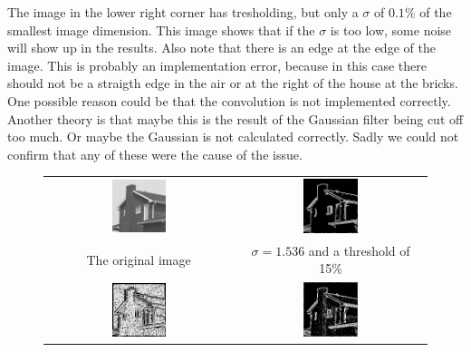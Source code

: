 \documentclass[a4paper]{article}
\begin{document}
\begin{enumerate}
    The image in the lower right corner has tresholding, but only a $\sigma$ of $0.1\%$ of the smallest image dimension.
    This image shows that if the $\sigma$ is too low, some noise will show up in the results.
    Also note that there is an edge at the edge of the image.
    This is probably an implementation error, because in this case there should not be a straigth edge in the air or at the right of the house at the bricks.
    One possible reason could be that the convolution is not implemented correctly.
    Another theory is that maybe this is the result of the Gaussian filter being cut off too much.
    Or maybe the Gaussian is not calculated correctly.
    Sadly we could not confirm that any of these were the cause of the issue.
\begin{figure}[H]
\centering
\begin{tabular}{cc}
    \includegraphics[width=0.3\textwidth]{../lab5ex1/house.png} & \includegraphics[width=0.3\textwidth]{../lab5ex1/mrhouse06t15.png} \\
    The original image & $\sigma = 1.536$ and a threshold of 15\% \\
    \includegraphics[width=0.3\textwidth]{../lab5ex1/mrhouse06t0.png} & \includegraphics[width=0.3\textwidth]{../lab5ex1/mrhouse01t15.png} \\

\end{tabular}
\end{figure}
\end{enumerate}
\end{document}
